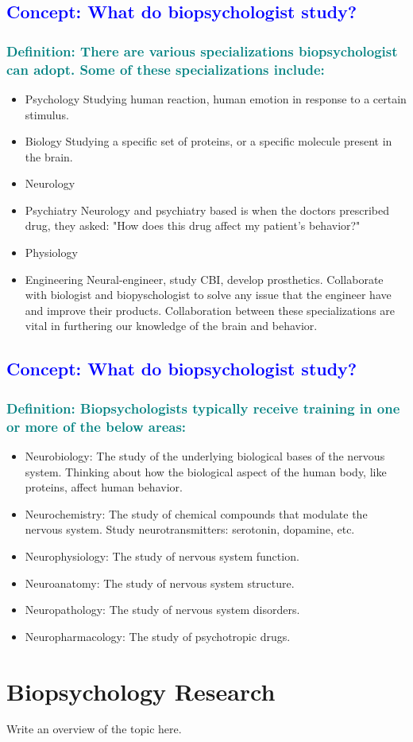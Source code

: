 \documentclass[12pt,a4paper]{article}
\newcommand{\concept}[1]{\subsection*{\textcolor{blue}{Concept: #1}}}
\newcommand{\definition}[1]{\subsubsection*{\textcolor{teal}{Definition: #1}}}
\begin{document}
	\concept{What do biopsychologist study?}
	\definition{There are various specializations biopsychologist can adopt. Some of these specializations include:}
	\begin{itemize}
		\item Psychology 
		\subitem Studying human reaction, human emotion in response to a certain stimulus.
		\item Biology
		\subitem Studying a specific set of proteins, or a specific molecule present in the brain. 
		\item Neurology 
		\item Psychiatry
		\subitem Neurology and psychiatry based is when the doctors prescribed drug, they asked: "How does this drug affect my patient's behavior?"
		\item Physiology 
		\item Engineering 
		\subitem Neural-engineer, study CBI, develop prosthetics. 
		\subitem Collaborate with biologist and biopyschologist to solve any issue that the engineer have and improve their products. 
		\subsubitem Collaboration between these specializations are vital in furthering our knowledge of the brain and behavior. 
	\end{itemize}
	\concept{What do biopsychologist study?}
	\definition{Biopsychologists typically receive training in one or more of the below areas:}
	\begin{itemize}
		\item Neurobiology: The study of the underlying biological bases of the nervous system. 
		\subitem Thinking about how the biological aspect of the human body, like proteins, affect human behavior. 
		\item Neurochemistry: The study of chemical compounds that modulate the nervous system. 
		\subitem Study neurotransmitters: serotonin, dopamine, etc. 
		\item Neurophysiology: The study of nervous system function. 
		\item Neuroanatomy: The study of nervous system structure. 
		\item Neuropathology: The study of nervous system disorders. 
		\item Neuropharmacology: The study of psychotropic drugs. 
	\end{itemize}
	
	\section*{Biopsychology Research}
	Write an overview of the topic here.
		
\end{document}
